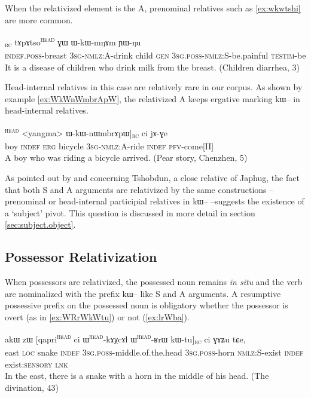 \documentclass[oldfontcommands,oneside,a4paper,11pt]{article}
\newcommand{\ipa}[1]{{\phon #1}} %
\newcommand{\tete}{\textsuperscript{\textsc{head}}}
\newcommand{\rc}{\textsubscript{\textsc{rc}}}
\begin{document}
When the relativized element is the A, prenominal relatives such as \ref{ex:wkwtshi} are more common.

\begin{exe}
   \ex  \label{ex:wkwtshi}
\gll [\ipa{tɯ-nɯ}  	\ipa{ɯ-kɯ-tsʰi}]\rc{}  	\ipa{tɤpɤtso}\tete{}  	\ipa{ɣɯ}  	\ipa{ɯ-kɯ-mŋɤm}  	\ipa{ɲɯ-ŋu}  \\
\textsc{indef.poss}-breast \textsc{3sg-nmlz:A}-drink child \textsc{gen} \textsc{3sg.poss-nmlz:S}-be.painful \textsc{testim}-be \\
\glt It is a disease of children who drink milk from the breast. (Children diarrhea, 3)
\end{exe}


Head-internal relatives in this case are relatively rare in our corpus. As shown by example  \ref{ex:WkWnWmbrApW}, the relativized A keeps ergative marking \ipa{kɯ--} in head-internal relatives.

\begin{exe}
   \ex  \label{ex:WkWnWmbrApW}
\gll [[\ipa{tɤpɤtso}  	\ipa{ci}  	\ipa{kɯ}]\tete{}  	<yangma> 	\ipa{ɯ-kɯ-nɯmbrɤpɯ}]\rc{}  	\ipa{ci}  	\ipa{jɤ-ɣe}  \\
boy \textsc{indef} \textsc{erg} bicycle \textsc{3sg-nmlz:A}-ride \textsc{indef} \textsc{pfv}-come[II] \\
\glt A boy who was riding a bicycle arrived. (Pear story, Chenzhen, 5)
\end{exe}


As pointed out by \citet{jackson03caodeng} and \citet{jackson06guanxiju} concerning Tshobdun, a close relative of Japhug, the fact that both S and A arguments are relativized by the same constructions -- prenominal or head-internal participial relatives in \ipa{kɯ--} --suggests  the existence of a `subject' pivot. This question is discussed in more detail in section \ref{sec:subject.object}.


\subsection{Possessor Relativization}

When possessors are relativized, the possessed noun remains \textit{in situ} and the verb are nominalized with the prefix \ipa{kɯ}-- like S and A arguments. A resumptive possessive prefix on the possessed noun is obligatory whether the possessor is overt (as in \ref{ex:WRrWkWtu}) or not (\ref{ex:lrWba}).

      \begin{exe}
   \ex \label{ex:WRrWkWtu}
 \gll 
\ipa{akɯ}   	\ipa{zɯ}   	[\ipa{qapri}\tete{}   	\ipa{ci}   	\ipa{ɯ}\tete{}-\ipa{kɤχcɤl}  	\ipa{ɯ}\tete{}-\ipa{ʁrɯ}   	\ipa{kɯ-tu}]\rc{}   	\ipa{ci}   	\ipa{ɣɤʑu}   	\ipa{tɕe,}   \\
east \textsc{loc} snake \textsc{indef} \textsc{3sg.poss}-middle.of.the.head  \textsc{3sg.poss}-horn \textsc{nmlz:S}-exist \textsc{indef} exist:\textsc{sensory}  \textsc{lnk} \\
\glt In the east, there is a snake with a horn in the middle of his head.  (The divination, 43)
\end{exe}
 
\end{document}

